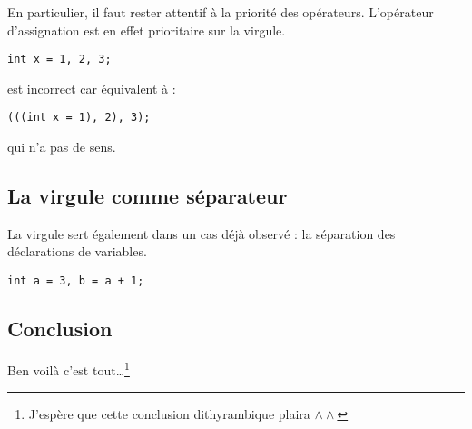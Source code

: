 \documentclass[../../../main.tex]{subfiles}
\begin{document}
En particulier, il faut rester attentif à la priorité des opérateurs. L’opérateur d’assignation est en effet
prioritaire sur la virgule.
\begin{verbatim}
int x = 1, 2, 3;
\end{verbatim}
est incorrect car équivalent à :
\begin{verbatim}
(((int x = 1), 2), 3);
\end{verbatim}
qui n’a pas de sens.
\subsection{La virgule comme séparateur}
\label{sub:la_virgule_comme_s_parateur}
La virgule sert également dans un cas déjà observé : la séparation des déclarations de variables.
\begin{verbatim}
int a = 3, b = a + 1;
\end{verbatim}
\subsection{Conclusion}
\label{sub:conclusion}
Ben voilà c’est tout\dots\footnote{J'espère que cette conclusion dithyrambique plaira $\wedge\wedge$}
\end{document}
